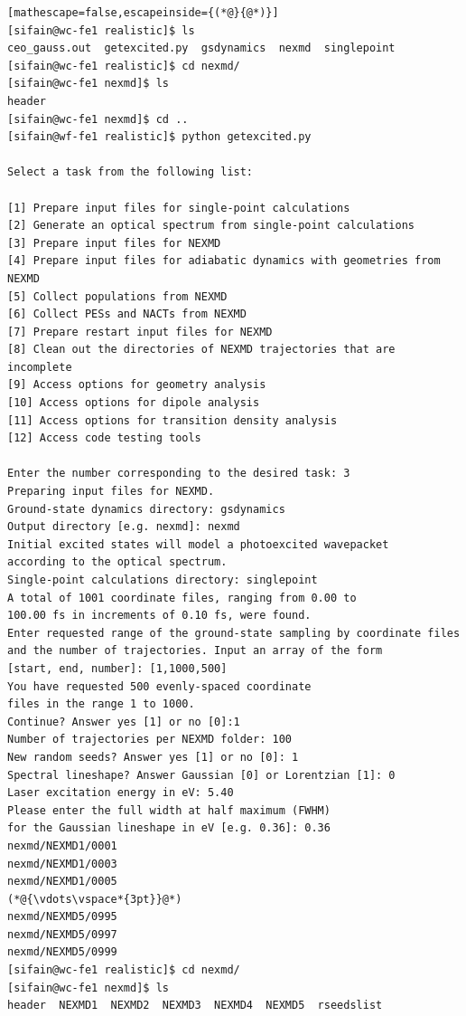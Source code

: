 \documentclass[letterpaper,12pt,titlepage]{article}
\begin{document}
\begin{lstlisting}[mathescape=false,escapeinside={(*@}{@*)}]
[sifain@wc-fe1 realistic]$ ls
ceo_gauss.out  getexcited.py  gsdynamics  nexmd  singlepoint
[sifain@wc-fe1 realistic]$ cd nexmd/
[sifain@wc-fe1 nexmd]$ ls
header
[sifain@wc-fe1 nexmd]$ cd ..
[sifain@wf-fe1 realistic]$ python getexcited.py 

Select a task from the following list:

[1] Prepare input files for single-point calculations
[2] Generate an optical spectrum from single-point calculations
[3] Prepare input files for NEXMD
[4] Prepare input files for adiabatic dynamics with geometries from NEXMD
[5] Collect populations from NEXMD
[6] Collect PESs and NACTs from NEXMD
[7] Prepare restart input files for NEXMD
[8] Clean out the directories of NEXMD trajectories that are incomplete
[9] Access options for geometry analysis
[10] Access options for dipole analysis
[11] Access options for transition density analysis
[12] Access code testing tools

Enter the number corresponding to the desired task: 3
Preparing input files for NEXMD.
Ground-state dynamics directory: gsdynamics
Output directory [e.g. nexmd]: nexmd 
Initial excited states will model a photoexcited wavepacket 
according to the optical spectrum.
Single-point calculations directory: singlepoint
A total of 1001 coordinate files, ranging from 0.00 to 
100.00 fs in increments of 0.10 fs, were found.
Enter requested range of the ground-state sampling by coordinate files
and the number of trajectories. Input an array of the form 
[start, end, number]: [1,1000,500]
You have requested 500 evenly-spaced coordinate 
files in the range 1 to 1000.
Continue? Answer yes [1] or no [0]:1
Number of trajectories per NEXMD folder: 100
New random seeds? Answer yes [1] or no [0]: 1
Spectral lineshape? Answer Gaussian [0] or Lorentzian [1]: 0
Laser excitation energy in eV: 5.40
Please enter the full width at half maximum (FWHM) 
for the Gaussian lineshape in eV [e.g. 0.36]: 0.36
nexmd/NEXMD1/0001
nexmd/NEXMD1/0003
nexmd/NEXMD1/0005
(*@{\vdots\vspace*{3pt}}@*)
nexmd/NEXMD5/0995
nexmd/NEXMD5/0997
nexmd/NEXMD5/0999
[sifain@wc-fe1 realistic]$ cd nexmd/
[sifain@wc-fe1 nexmd]$ ls
header  NEXMD1  NEXMD2  NEXMD3  NEXMD4  NEXMD5  rseedslist
\end{lstlisting}
\end{document}
